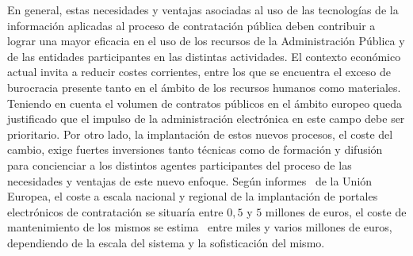 En general, estas necesidades y ventajas asociadas al uso de las tecnologías de la información
aplicadas al proceso de contratación pública deben contribuir a lograr una mayor eficacia
en el uso de los recursos de la Administración Pública y de las entidades participantes
en las distintas actividades. El contexto económico actual invita a reducir costes
corrientes, entre los que se encuentra el exceso de burocracia presente tanto en el ámbito de los recursos humanos como materiales. 
Teniendo en cuenta el volumen de contratos públicos en el ámbito europeo queda justificado que el impulso de la administración electrónica en este campo debe ser
prioritario. Por otro lado, la implantación de estos nuevos procesos, el coste del cambio, exige
fuertes inversiones tanto técnicas como de formación y difusión para concienciar a los distintos
agentes participantes del proceso de las necesidades y ventajas de este nuevo enfoque. Según
informes~\cite{e-Proc-green-paper} de la Unión Europea, el coste a escala nacional y regional
de la implantación de portales electrónicos de contratación se situaría entre $0,5$ y $5$ millones
de euros, el coste de mantenimiento de los mismos se estima~\cite{ePractice} entre miles y varios millones
de euros, dependiendo de la escala del sistema y la sofisticación del mismo.


